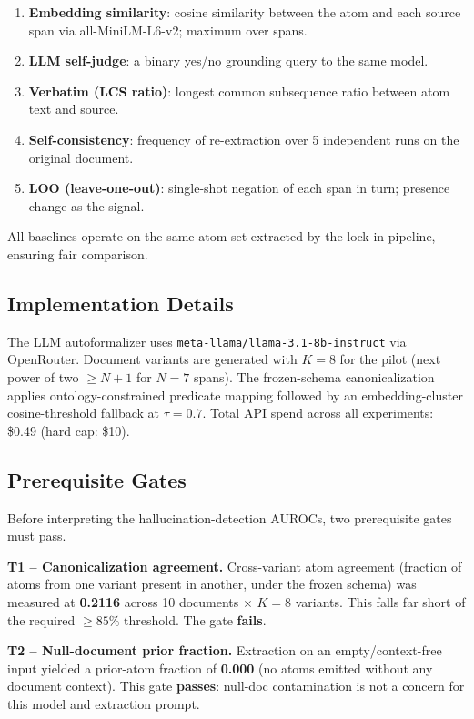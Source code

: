 \documentclass[11pt,letterpaper]{article}
\begin{document}
\begin{enumerate}
  \item \textbf{Embedding similarity}: cosine similarity between the atom and each source span via
    all-MiniLM-L6-v2; maximum over spans.
  \item \textbf{LLM self-judge}: a binary yes/no grounding query to the same model.
  \item \textbf{Verbatim (LCS ratio)}: longest common subsequence ratio between atom text and source.
  \item \textbf{Self-consistency}: frequency of re-extraction over 5 independent runs on the original document.
  \item \textbf{LOO (leave-one-out)}: single-shot negation of each span in turn; presence change as the signal.
\end{enumerate}

All baselines operate on the same atom set extracted by the lock-in pipeline, ensuring fair comparison.

\subsection{Implementation Details}

The LLM autoformalizer uses \texttt{meta-llama/llama-3.1-8b-instruct} via OpenRouter. Document variants are generated
with $K = 8$ for the pilot (next power of two $\geq N+1$ for $N=7$ spans). The frozen-schema canonicalization applies
ontology-constrained predicate mapping followed by an embedding-cluster cosine-threshold fallback at $\tau = 0.7$.
Total API spend across all experiments: \$0.49 (hard cap: \$10).

\subsection{Prerequisite Gates}

Before interpreting the hallucination-detection AUROCs, two prerequisite gates must pass.

\textbf{T1 -- Canonicalization agreement.}  Cross-variant atom agreement (fraction of atoms from one variant present
in another, under the frozen schema) was measured at \textbf{0.2116} across 10 documents $\times$ $K=8$ variants.
This falls far short of the required $\geq 85\%$ threshold. The gate \textbf{fails}.

\textbf{T2 -- Null-document prior fraction.} Extraction on an empty/context-free input yielded a prior-atom fraction
of \textbf{0.000} (no atoms emitted without any document context). This gate \textbf{passes}: null-doc contamination
is not a concern for this model and extraction prompt.
\end{document}
